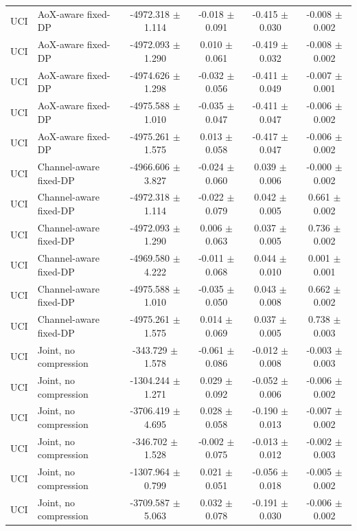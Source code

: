 \begin{table}[t]
\begin{tabular}{llcccc}
UCI & AoX-aware fixed-DP & -4972.318 $\pm$ 1.114 & -0.018 $\pm$ 0.091 & -0.415 $\pm$ 0.030 & -0.008 $\pm$ 0.002 \\
UCI & AoX-aware fixed-DP & -4972.093 $\pm$ 1.290 & 0.010 $\pm$ 0.061 & -0.419 $\pm$ 0.032 & -0.008 $\pm$ 0.002 \\
UCI & AoX-aware fixed-DP & -4974.626 $\pm$ 1.298 & -0.032 $\pm$ 0.056 & -0.411 $\pm$ 0.049 & -0.007 $\pm$ 0.001 \\
UCI & AoX-aware fixed-DP & -4975.588 $\pm$ 1.010 & -0.035 $\pm$ 0.047 & -0.411 $\pm$ 0.047 & -0.006 $\pm$ 0.002 \\
UCI & AoX-aware fixed-DP & -4975.261 $\pm$ 1.575 & 0.013 $\pm$ 0.058 & -0.417 $\pm$ 0.047 & -0.006 $\pm$ 0.002 \\
UCI & Channel-aware fixed-DP & -4966.606 $\pm$ 3.827 & -0.024 $\pm$ 0.060 & 0.039 $\pm$ 0.006 & -0.000 $\pm$ 0.002 \\
UCI & Channel-aware fixed-DP & -4972.318 $\pm$ 1.114 & -0.022 $\pm$ 0.079 & 0.042 $\pm$ 0.005 & 0.661 $\pm$ 0.002 \\
UCI & Channel-aware fixed-DP & -4972.093 $\pm$ 1.290 & 0.006 $\pm$ 0.063 & 0.037 $\pm$ 0.005 & 0.736 $\pm$ 0.002 \\
UCI & Channel-aware fixed-DP & -4969.580 $\pm$ 4.222 & -0.011 $\pm$ 0.068 & 0.044 $\pm$ 0.010 & 0.001 $\pm$ 0.001 \\
UCI & Channel-aware fixed-DP & -4975.588 $\pm$ 1.010 & -0.035 $\pm$ 0.050 & 0.043 $\pm$ 0.008 & 0.662 $\pm$ 0.002 \\
UCI & Channel-aware fixed-DP & -4975.261 $\pm$ 1.575 & 0.014 $\pm$ 0.069 & 0.037 $\pm$ 0.005 & 0.738 $\pm$ 0.003 \\
UCI & Joint, no compression & -343.729 $\pm$ 1.578 & -0.061 $\pm$ 0.086 & -0.012 $\pm$ 0.008 & -0.003 $\pm$ 0.003 \\
UCI & Joint, no compression & -1304.244 $\pm$ 1.271 & 0.029 $\pm$ 0.092 & -0.052 $\pm$ 0.006 & -0.006 $\pm$ 0.002 \\
UCI & Joint, no compression & -3706.419 $\pm$ 4.695 & 0.028 $\pm$ 0.058 & -0.190 $\pm$ 0.013 & -0.007 $\pm$ 0.002 \\
UCI & Joint, no compression & -346.702 $\pm$ 1.528 & -0.002 $\pm$ 0.075 & -0.013 $\pm$ 0.012 & -0.002 $\pm$ 0.003 \\
UCI & Joint, no compression & -1307.964 $\pm$ 0.799 & 0.021 $\pm$ 0.051 & -0.056 $\pm$ 0.018 & -0.005 $\pm$ 0.002 \\
UCI & Joint, no compression & -3709.587 $\pm$ 5.063 & 0.032 $\pm$ 0.078 & -0.191 $\pm$ 0.030 & -0.006 $\pm$ 0.002 \\

\end{tabular}
\end{table}
